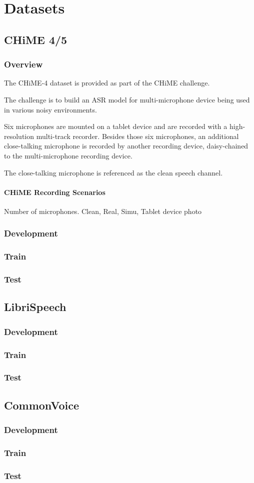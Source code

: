 \chapter{Datasets}
\section{CHiME 4/5}
\subsection{Overview}
The CHiME-4 dataset is provided 
as part of the CHiME challenge.

The challenge is to build an ASR model
for multi-microphone device being used
in various noisy environments.

Six microphones are mounted on a tablet
device and are recorded with a high-resolution
multi-track recorder. Besides those six 
microphones, an additional 
close-talking microphone is recorded by
another recording device, daisy-chained to the
multi-microphone recording device.

The close-talking microphone is referenced as
the clean speech channel.

\subsubsection{CHiME Recording Scenarios}



Number of microphones.
Clean, Real, Simu,
Tablet device photo
\subsection{Development}
\subsection{Train}
\subsection{Test}

\section{LibriSpeech}
\subsection{Development}
\subsection{Train}
\subsection{Test}

\section{CommonVoice}
\subsection{Development}
\subsection{Train}
\subsection{Test}


